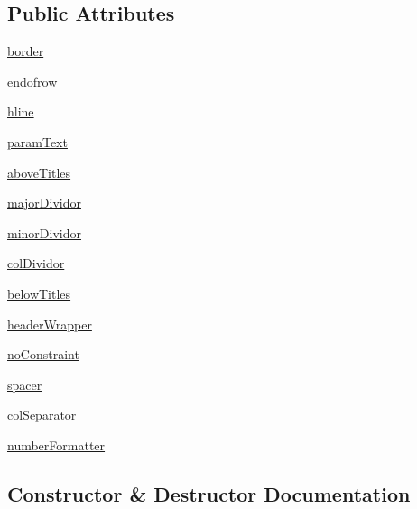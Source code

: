 \subsection*{Public Attributes}
\begin{DoxyCompactItemize}
\item 
\mbox{\hyperlink{classgetdist_1_1types_1_1TableFormatter_a126b3f09c072f7215f89642b3adf7835}{border}}
\item 
\mbox{\hyperlink{classgetdist_1_1types_1_1TableFormatter_a1e106b1f4cf389eda9cfa2575c2f0944}{endofrow}}
\item 
\mbox{\hyperlink{classgetdist_1_1types_1_1TableFormatter_a0f0973e44cc55032c482c7b8dbfb4644}{hline}}
\item 
\mbox{\hyperlink{classgetdist_1_1types_1_1TableFormatter_ac8cb194c46dbbeb6ff6f1a13fff3d0c5}{param\+Text}}
\item 
\mbox{\hyperlink{classgetdist_1_1types_1_1TableFormatter_a071bf6e7e970330f95dd73023e37e4b4}{above\+Titles}}
\item 
\mbox{\hyperlink{classgetdist_1_1types_1_1TableFormatter_a057f91e3958e5a2818fa3470db8967a4}{major\+Dividor}}
\item 
\mbox{\hyperlink{classgetdist_1_1types_1_1TableFormatter_ab2a6138e3b49b92052d651342c39c8b6}{minor\+Dividor}}
\item 
\mbox{\hyperlink{classgetdist_1_1types_1_1TableFormatter_a80d220bef9cfcfc80ebdf540cc5d8953}{col\+Dividor}}
\item 
\mbox{\hyperlink{classgetdist_1_1types_1_1TableFormatter_a6f6912dd6202217378f1f8bdff9d360b}{below\+Titles}}
\item 
\mbox{\hyperlink{classgetdist_1_1types_1_1TableFormatter_a77e5445f0fdea595b6d2581c7e9cb18a}{header\+Wrapper}}
\item 
\mbox{\hyperlink{classgetdist_1_1types_1_1TableFormatter_a616558a50561f57469d66a941fe07eed}{no\+Constraint}}
\item 
\mbox{\hyperlink{classgetdist_1_1types_1_1TableFormatter_a9b3217a37b10851d37e2b6605f95f070}{spacer}}
\item 
\mbox{\hyperlink{classgetdist_1_1types_1_1TableFormatter_afc46650eade45b47b24f8668f9cb2b21}{col\+Separator}}
\item 
\mbox{\hyperlink{classgetdist_1_1types_1_1TableFormatter_afc8e1e55562e33174450fe99371baf68}{number\+Formatter}}
\end{DoxyCompactItemize}


\subsection{Constructor \& Destructor Documentation}
\mbox{\label{classgetdist_1_1types_1_1TableFormatter_a03467618c1f6085cbbef865e5610c2b3}} 
